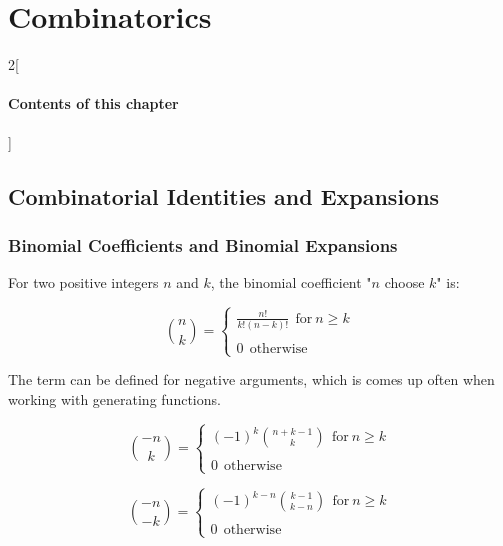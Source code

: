 \chapter{Combinatorics}

\begin{multicols}{2}[\subsubsection*{Contents of this chapter}]
\end{multicols}



\section{Combinatorial Identities and Expansions}

\subsection{Binomial Coefficients and Binomial Expansions}

For two positive integers $n$ and $k$, the binomial coefficient "$n$ choose $k$" is:

\begin{equation}
{n \choose k} = \left\{ \begin{array}{c} 
\frac{n!}{k!(n-k)!}\ \ \mathrm{for\ }n\geq k\\
\\
0 \ \ \mathrm{otherwise}
\end{array}\right.
\end{equation}

The term can be defined for negative arguments, which is comes up often when working with generating functions.

\begin{equation}
{-n \choose k} = \left\{\begin{array}{c}
(-1)^k { n+k-1 \choose k}\ \ \mathrm{for\ }n\geq k\\
\\
0 \ \ \mathrm{otherwise}
\end{array}\right.
\end{equation}


\begin{equation}
{-n \choose -k} = \left\{\begin{array}{c}
(-1)^{k-n} {k-1 \choose k-n}\ \ \mathrm{for\ }n\geq k\\
\\
0 \ \ \mathrm{otherwise}
\end{array}\right.
\end{equation}

